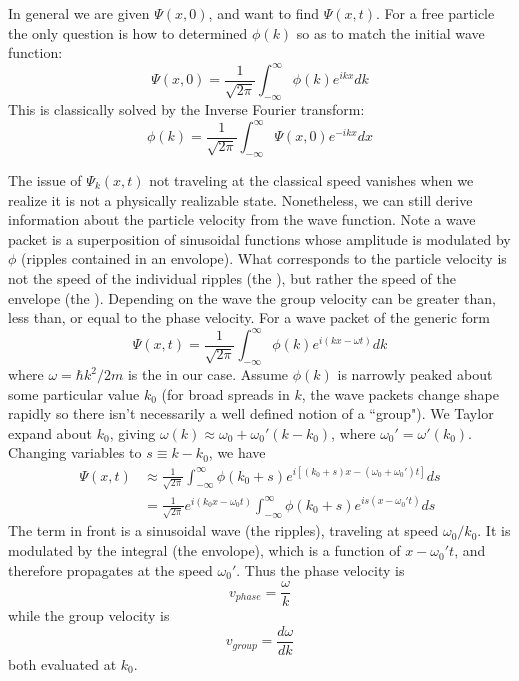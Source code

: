 \documentclass[12pt, a4paper, oneside, openright, titlepage]{book}
\begin{document}
In general we are given $\Psi(x,0)$, and want to find $\Psi(x,t)$. For a free particle the only question is how to determined $\phi(k)$ so as to match the initial wave function: \begin{equation*}
    \Psi(x,0) = \frac{1}{\sqrt{2\pi}}\int_{-\infty}^{\infty}\phi(k)e^{ikx}dk
\end{equation*}
This is classically solved by the Inverse Fourier transform: \begin{equation*}
    \boxed{\phi(k) = \frac{1}{\sqrt{2\pi}}\int_{-\infty}^{\infty}\Psi(x,0)e^{-ikx}dx}
\end{equation*}

The issue of $\Psi_k(x,t)$ not traveling at the classical speed vanishes when we realize it is not a physically realizable state. Nonetheless, we can still derive information about the particle velocity from the wave function. Note a wave packet is a superposition of sinusoidal functions whose amplitude is modulated by $\phi$ (ripples contained in an envolope). What corresponds to the particle velocity is not the speed of the individual ripples (the ), but rather the speed of the envelope (the ). Depending on the wave the group velocity can be greater than, less than, or equal to the phase velocity. For a wave packet of the generic form \begin{equation*}
    \Psi(x,t) = \frac{1}{\sqrt{2\pi}}\int_{-\infty}^{\infty}\phi(k)e^{i(kx-\omega t)}dk
\end{equation*}
where $\omega = \hbar k^2/2m$ is the  in our case. Assume $\phi(k)$ is narrowly peaked about some particular value $k_0$ (for broad spreads in $k$, the wave packets change shape rapidly so there isn't necessarily a well defined notion of a ``group"). We Taylor expand about $k_0$, giving $\omega(k)\approx \omega_0 + \omega_0'(k-k_0)$, where $\omega_0' = \omega'(k_0)$. Changing variables to $s\equiv k-k_0$, we have \begin{align*}
    \Psi(x,t) &\approx \frac{1}{\sqrt{2\pi}}\int_{-\infty}^{\infty}\phi(k_0+s)e^{i[(k_0+s)x-(\omega_0+\omega_0')t]}ds \\
    &= \frac{1}{\sqrt{2\pi}}e^{i(k_0x-\omega_0t)}\int_{-\infty}^{\infty}\phi(k_0+s)e^{is(x-\omega_0't)}ds
\end{align*}
The term in front is a sinusoidal wave (the ripples), traveling at speed $\omega_0/k_0$. It is modulated by the integral (the envolope), which is a function of $x-\omega_0't$, and therefore propagates at the speed $\omega_0'$. Thus the phase velocity is \begin{equation*}
    \boxed{v_{phase} = \frac{\omega}{k}}
\end{equation*}
while the group velocity is \begin{equation*}
    \boxed{v_{group} = \frac{d\omega}{dk}}
\end{equation*}
both evaluated at $k_0$.
\end{document}
